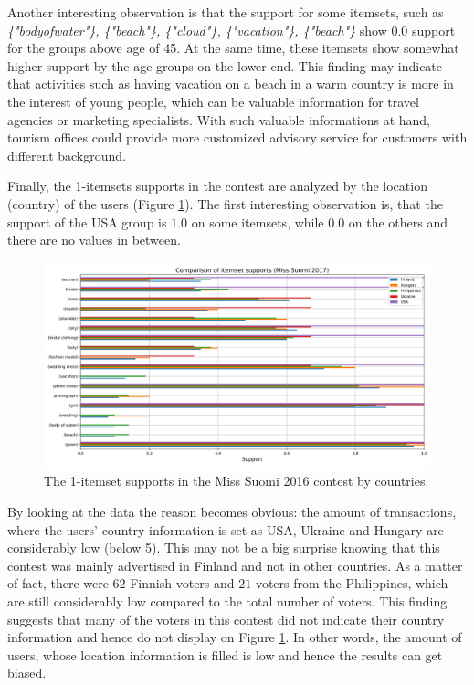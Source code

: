 Another interesting observation is that the support for some itemsets, such as \textit{\{"body\:of\:water"\}, \{"beach"\}, \{"cloud"\}, \{"vacation"\}, \{"beach"\}} show 0.0 support for the groups above age of 45. At the same time, these itemsets show somewhat higher support by the age groups on the lower end. This finding may indicate that activities such as having vacation on a beach in a warm country is more in the interest of young people, which can be valuable information for travel agencies or marketing specialists. With such valuable informations at hand, tourism offices could provide more customized advisory service for customers with different background. 

Finally, the 1-itemsets supports in the contest are analyzed by the location (country) of the users (Figure \ref{itemset_supports-country-Miss_Helsinki-1_itemset}). The first interesting observation is, that the support of the USA group is $1.0$ on some itemsets, while 0.0 on the others and there are no values in between.

\begin{figure}[h] 
    \begin{center}
        \includegraphics[width=1.0\textwidth]{Images/itemset_supports-country-Miss_Helsinki-1_itemset.png}
        \caption{The 1-itemset supports in the Miss Suomi 2016 contest by countries.}
        \label{itemset_supports-country-Miss_Helsinki-1_itemset}
    \end{center}
\end{figure}

By looking at the data the reason becomes obvious: the amount of transactions, where the users' country information is set as USA, Ukraine and Hungary are considerably low (below 5). This may not be a big surprise knowing that this contest was mainly advertised in Finland and not in other countries. As a matter of fact, there were $62$ Finnish voters and $21$ voters from the Philippines, which are still considerably low compared to the total number of voters. This finding suggests that many of the voters in this contest did not indicate their country information and hence do not display on Figure \ref{itemset_supports-country-Miss_Helsinki-1_itemset}. In other words, the amount of users, whose location information is filled is low and hence the results can get biased. 

